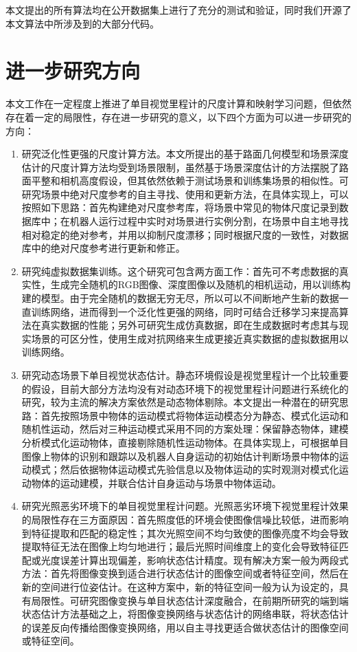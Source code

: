 本文提出的所有算法均在公开数据集上进行了充分的测试和验证，同时我们开源了本文算法中所涉及到的大部分代码。

\section{进一步研究方向}
本文工作在一定程度上推进了单目视觉里程计的尺度计算和映射学习问题，但依然存在着一定的局限性，存在进一步研究的意义，以下四个方面为可以进一步研究的方向：
\begin{enumerate}
    \item 研究泛化性更强的尺度计算方法。本文所提出的基于路面几何模型和场景深度估计的尺度计算方法均受到场景限制，虽然基于场景深度估计的方法摆脱了路面平整和相机高度假设，但其依然依赖于测试场景和训练集场景的相似性。可研究场景中绝对尺度参考的自主寻找、使用和更新方法，在具体实现上，可以按照如下思路：首先构建绝对尺度参考库，将场景中常见的物体尺度记录到数据库中；在机器人运行过程中实时对场景进行实例分割，在场景中自主地寻找相对稳定的绝对参考，并用以抑制尺度漂移；同时根据尺度的一致性，对数据库中的绝对尺度参考进行更新和修正。
    \item 研究纯虚拟数据集训练。这个研究可包含两方面工作：首先可不考虑数据的真实性，生成完全随机的RGB图像、深度图像以及随机的相机运动，用以训练构建的模型。由于完全随机的数据无穷无尽，所以可以不间断地产生新的数据一直训练网络，进而得到一个泛化性更强的网络，同时可结合迁移学习来提高算法在真实数据的性能；另外可研究生成仿真数据，即在生成数据时考虑其与现实场景的可区分性，使用生成对抗网络来生成更接近真实数据的虚拟数据用以训练网络。
    \item 研究动态场景下单目视觉状态估计。静态环境假设是视觉里程计一个比较重要的假设，目前大部分方法均没有对动态环境下的视觉里程计问题进行系统化的研究，较为主流的解决方案依然是动态物体剔除。本文提出一种潜在的研究思路：首先按照场景中物体的运动模式将物体运动模态分为静态、模式化运动和随机性运动，然后对三种运动模式采用不同的方案处理：保留静态物体，建模分析模式化运动物体，直接剔除随机性运动物体。在具体实现上，可根据单目图像上物体的识别和跟踪以及机器人自身运动的初始估计判断场景中物体的运动模式；然后依据物体运动模式先验信息以及物体运动的实时观测对模式化运动物体的运动建模，并联合估计自身运动与场景中物体运动。
    \item 研究光照恶劣环境下的单目视觉里程计问题。光照恶劣环境下视觉里程计效果的局限性存在三方面原因：首先照度低的环境会使图像信噪比较低，进而影响到特征提取和匹配的稳定性；其次光照空间不均匀致使的图像亮度不均会导致提取特征无法在图像上均匀地进行；最后光照时间维度上的变化会导致特征匹配或光度误差计算出现偏差，影响状态估计精度。现有解决方案一般为两段式方法：首先将图像变换到适合进行状态估计的图像空间或者特征空间，然后在新的空间进行位姿估计。在这种方案中，新的特征空间一般为认为设定的，具有局限性。可研究图像变换与单目状态估计深度融合，在前期所研究的端到端状态估计方法基础之上，将图像变换网络与状态估计的网络串联，将状态估计的误差反向传播给图像变换网络，用以自主寻找更适合做状态估计的图像空间或特征空间。
\end{enumerate}
